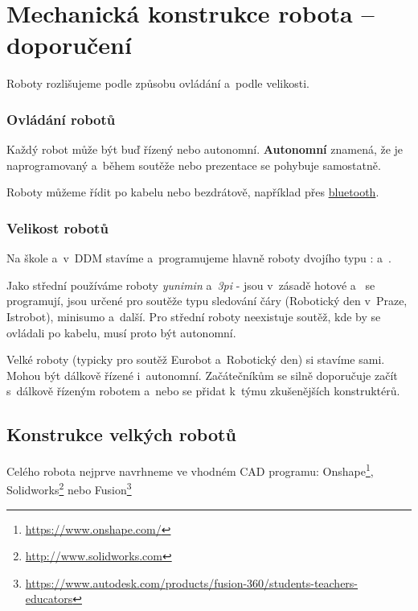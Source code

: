 \section{Mechanická konstrukce robota -- doporučení}
 
\label{konstrukce}
  

Roboty rozlišujeme podle způsobu ovládání a~podle velikosti. 

\subsubsection*{Ovládání robotů} 

\hypertarget{autonomni}{}

Každý robot může být buď řízený nebo autonomní.
 {\bf Autonomní }znamená, že je naprogramovaný a~během soutěže nebo prezentace se pohybuje samostatně.  

Roboty můžeme řídit po kabelu nebo bezdrátově, například přes  \hyperlink{bluetooth}{bluetooth}.   

 
\subsubsection*{Velikost robotů} 
 
Na škole a~v~DDM stavíme a~programujeme hlavně roboty dvojího typu :
 a~. 

  Jako střední používáme roboty {\it yunimin} a~{\it 3pi} - jsou v~zásadě hotové
a~ se programují, jsou určené pro soutěže typu sledování čáry (Robotický den v~Praze, Istrobot), minisumo a~další. 
Pro střední roboty neexistuje soutěž, kde by se ovládali po kabelu, musí proto být autonomní.    
 
 Velké roboty (typicky pro soutěž Eurobot a~Robotický den) si stavíme sami. 
 Mohou být dálkově řízené i~autonomní. 
 Začátečníkům se silně doporučuje začít s~dálkově řízeným robotem a~nebo se přidat k~týmu zkušenějších konstruktérů.   
 
\subsection{Konstrukce velkých robotů}
 
Celého robota nejprve navrhneme ve vhodném  CAD programu: Onshape\footnote{\url{https://www.onshape.com/}}, 
Solidworks\footnote{\url{http://www.solidworks.com}} nebo Fusion\footnote{\url{ https://www.autodesk.com/products/fusion-360/students-teachers-educators}}

